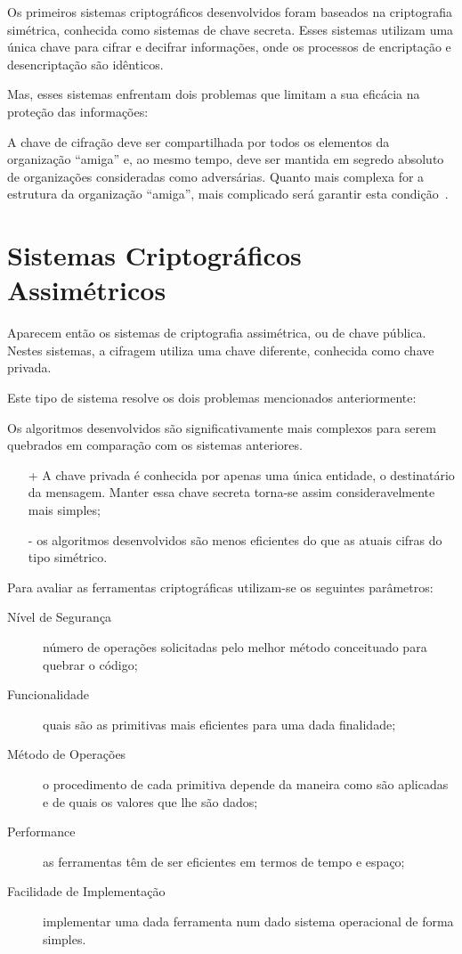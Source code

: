 Os primeiros sistemas criptográficos desenvolvidos foram baseados na criptografia simétrica, conhecida como sistemas de chave secreta. Esses sistemas utilizam uma única chave para cifrar e decifrar informações, onde os processos de encriptação e desencriptação são idênticos.

Mas, esses sistemas enfrentam dois problemas que limitam a sua eficácia na proteção das informações:

A chave de cifração deve ser compartilhada por todos os elementos da organização ``amiga'' e, ao mesmo tempo, deve ser mantida em segredo absoluto de organizações consideradas como adversárias. Quanto mais complexa for a estrutura da organização ``amiga'', mais complicado será garantir esta condição~\cite{Quaresma2009a}.

\section{Sistemas Criptográficos Assimétricos}
\label{sec:SistemasCriptograficosAssimetricos}
Aparecem então os sistemas de criptografia assimétrica, ou de chave pública. Nestes sistemas, a cifragem utiliza uma chave diferente, conhecida como chave privada.

Este tipo de sistema resolve os dois problemas mencionados anteriormente:


Os algoritmos desenvolvidos são significativamente mais complexos para serem quebrados em comparação com os sistemas anteriores.

\begin{itemize}
    \item[+] A chave privada é conhecida por apenas uma única entidade, o destinatário da mensagem. Manter essa chave secreta torna-se assim consideravelmente mais simples;
    \item[-] os algoritmos desenvolvidos são menos eficientes do que as atuais cifras do tipo simétrico.
\end{itemize}

Para avaliar as ferramentas criptográficas utilizam-se os seguintes parâmetros:
\begin{description}
   \item[Nível de Segurança] número de operações solicitadas pelo melhor método conceituado para quebrar o código;
   \item[Funcionalidade]  quais são as primitivas mais eficientes para uma dada finalidade;
   \item[Método de Operações] o procedimento de cada primitiva depende da maneira como são aplicadas e de quais os valores que lhe são dados;
   \item[Performance] as ferramentas têm de ser eficientes em termos de tempo e espaço;
   \item[Facilidade de Implementação] implementar uma dada ferramenta num dado sistema operacional de forma simples.
\end{description}

